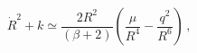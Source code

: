 \begin{equation}\dot{R}^2+k \simeq \frac{2 R^2}{(\beta+2)}\left(\frac{\mu}{R^4}-
\frac{q^2}{R^6}\right)\,,\label{small-b}\end{equation}

